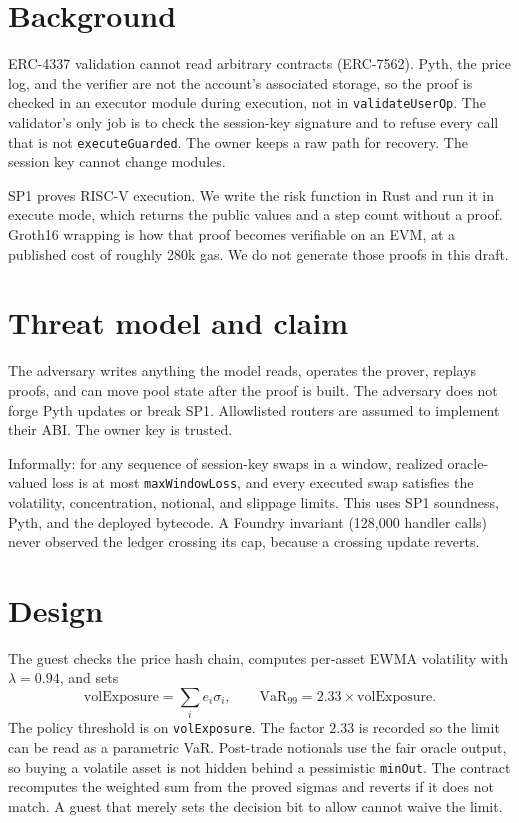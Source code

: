 \documentclass[11pt]{article}
\begin{document}
\section{Background}

ERC-4337 validation cannot read arbitrary contracts (ERC-7562). Pyth, the price log, and the verifier are not the account's associated storage, so the proof is checked in an executor module during execution, not in \texttt{validateUserOp}. The validator's only job is to check the session-key signature and to refuse every call that is not \texttt{executeGuarded}. The owner keeps a raw path for recovery. The session key cannot change modules.

SP1 proves RISC-V execution. We write the risk function in Rust and run it in execute mode, which returns the public values and a step count without a proof. Groth16 wrapping is how that proof becomes verifiable on an EVM, at a published cost of roughly 280k gas. We do not generate those proofs in this draft.

\section{Threat model and claim}

The adversary writes anything the model reads, operates the prover, replays proofs, and can move pool state after the proof is built. The adversary does not forge Pyth updates or break SP1. Allowlisted routers are assumed to implement their ABI. The owner key is trusted.

Informally: for any sequence of session-key swaps in a window, realized oracle-valued loss is at most \texttt{maxWindowLoss}, and every executed swap satisfies the volatility, concentration, notional, and slippage limits. This uses SP1 soundness, Pyth, and the deployed bytecode. A Foundry invariant (128{,}000 handler calls) never observed the ledger crossing its cap, because a crossing update reverts.

\section{Design}

The guest checks the price hash chain, computes per-asset EWMA volatility with $\lambda = 0.94$, and sets
\[
\mathrm{volExposure} = \sum_i e_i \sigma_i, \qquad \mathrm{VaR}_{99} = 2.33 \times \mathrm{volExposure}.
\]
The policy threshold is on \texttt{volExposure}. The factor $2.33$ is recorded so the limit can be read as a parametric VaR. Post-trade notionals use the fair oracle output, so buying a volatile asset is not hidden behind a pessimistic \texttt{minOut}. The contract recomputes the weighted sum from the proved sigmas and reverts if it does not match. A guest that merely sets the decision bit to allow cannot waive the limit.
\end{document}
